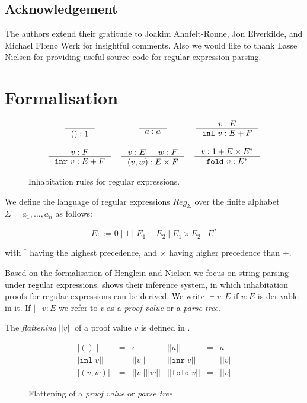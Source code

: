 \documentclass[a4paper, oneside]{memoir}
\let\fref\undefined
\let\Fref\undefined
\theoremstyle{definition}
\begin{document}
\section{Acknowledgement}

The authors extend their gratitude to Joakim Ahnfelt-Rønne, Jon Elverkilde, and
Michael Flænø Werk for insightful comments. Also we would like to thank Lasse
Nielsen for providing useful source code for regular expression parsing.

\chapter{Formalisation}
\label{chap:formalisation}

\begin{figure}
\[
\begin{array}{ccc}
  \inference{}{() : 1}
&
  \inference{}{a : a}
&
  \inference{v : E}{\mathtt{inl}\ v : E + F}
\\
\\
  \inference{v : F}{\mathtt{inr}\ v : E + F}
&
  \inference{v : E & w : F}{(v, w) : E \times F}
&
  \inference{v : 1 + E \times E^{\ast}}{\mathtt{fold}\ v : E^{\ast}}
\end{array}
\]
\caption{Inhabitation rules for regular expressions.}
\label{fig:inhabitation}
\end{figure}

We define the language of regular expressions $Reg_\Sigma$ over the finite
alphabet $\Sigma = {a_1, \dots, a_n}$ as follows:

\[
    E ::= 0 \; | \; 1 \; | \; E_1 + E_2 \; | \; E_1 \times E_2 \; | \; E^{*}
\]

\noindent with ${}^{\ast}$ having the highest precedence, and $\times$ having
higher precedence than $+$.

Based on the formalisation of Henglein and Nielsen \cite{heni2010} we focus on
string parsing under regular expressions. \Fref{fig:inhabitation}
shows their inference system, in which inhabitation proofs for regular
expressions can be derived. We write $\vdash v : E$ if $v : E$ is derivable in
it. If $|- v : E$ we refer to $v$ as a \emph{proof value} or a \emph{parse tree}.

The \emph{flattening} $||v||$ of a proof value $v$ is defined in \fref{fig:flatten}.

\begin{figure}
\[
\begin{array}{rclrcl}
||()|| & = & \epsilon &
||a||  & = & a \\
|| \mathtt{inl} \; v|| & = & ||v|| &
|| \mathtt{inr} \; v|| & = & ||v|| \\
|| (v,w)|| & = & ||v||||w|| &
|| \mathtt{fold} \; v|| & = & ||v||
\end{array}
\]
\caption{Flattening of a \emph{proof value} or \emph{parse tree}}
\label{fig:flatten}
\end{figure}
\end{document}
